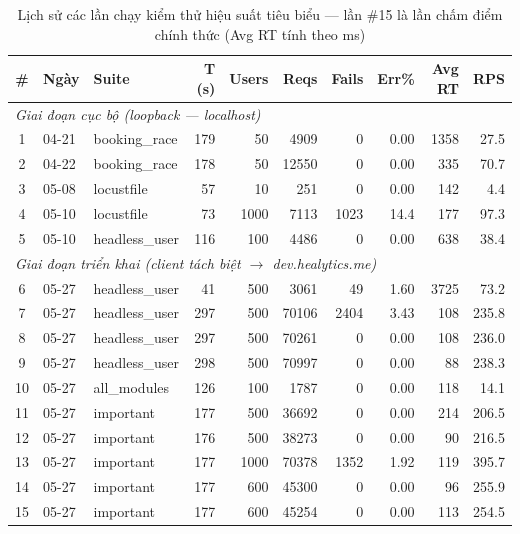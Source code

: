 \begin{table}[H]
\centering
\footnotesize
\begin{tabular}{|c|p{}|p{}|r|r|r|r|r|r|r|}
\hline
\textbf{\#} & \textbf{Ngày} & \textbf{Suite} & \textbf{T (s)} & \textbf{Users} & \textbf{Reqs} & \textbf{Fails} & \textbf{Err\%} & \textbf{Avg RT} & \textbf{RPS} \\
\hline
\multicolumn{10}{|l|}{\textit{Giai đoạn cục bộ (loopback --- localhost)}} \\
\hline
1 & 04-21 & booking\_race & 179 & 50 & 4909 & 0 & 0.00 & 1358 & 27.5 \\
\hline
2 & 04-22 & booking\_race & 178 & 50 & 12550 & 0 & 0.00 & 335 & 70.7 \\
\hline
3 & 05-08 & locustfile & 57 & 10 & 251 & 0 & 0.00 & 142 & 4.4 \\
\hline
4 & 05-10 & locustfile & 73 & 1000 & 7113 & 1023 & 14.4 & 177 & 97.3 \\
\hline
5 & 05-10 & headless\_user & 116 & 100 & 4486 & 0 & 0.00 & 638 & 38.4 \\
\hline
\multicolumn{10}{|l|}{\textit{Giai đoạn triển khai (client tách biệt $\rightarrow$ dev.healytics.me)}} \\
\hline
6 & 05-27 & headless\_user & 41 & 500 & 3061 & 49 & 1.60 & 3725 & 73.2 \\
\hline
7 & 05-27 & headless\_user & 297 & 500 & 70106 & 2404 & 3.43 & 108 & 235.8 \\
\hline
8 & 05-27 & headless\_user & 297 & 500 & 70261 & 0 & 0.00 & 108 & 236.0 \\
\hline
9 & 05-27 & headless\_user & 298 & 500 & 70997 & 0 & 0.00 & 88 & 238.3 \\
\hline
10 & 05-27 & all\_modules & 126 & 100 & 1787 & 0 & 0.00 & 118 & 14.1 \\
\hline
11 & 05-27 & important & 177 & 500 & 36692 & 0 & 0.00 & 214 & 206.5 \\
\hline
12 & 05-27 & important & 176 & 500 & 38273 & 0 & 0.00 & 90 & 216.5 \\
\hline
13 & 05-27 & important & 177 & 1000 & 70378 & 1352 & 1.92 & 119 & 395.7 \\
\hline
14 & 05-27 & important & 177 & 600 & 45300 & 0 & 0.00 & 96 & 255.9 \\
\hline
15 & 05-27 & important & 177 & 600 & 45254 & 0 & 0.00 & 113 & 254.5 \\
\hline
\end{tabular}
\caption{Lịch sử các lần chạy kiểm thử hiệu suất tiêu biểu --- lần \#15 là lần chấm điểm chính thức (Avg RT tính theo ms)}
\label{tab:perf_run_timeline}
\end{table}


